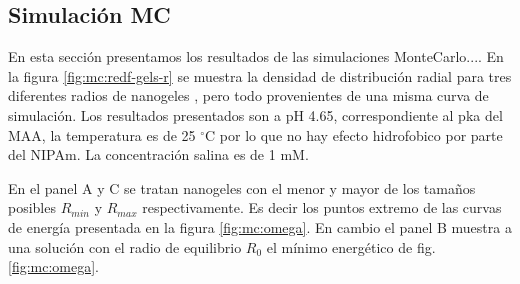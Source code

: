 






\subsection{Simulaci\'on MC}

En esta secci\'on presentamos los resultados de las simulaciones MonteCarlo....
En la figura \ref{fig:mc:redf-gels-r} se muestra la densidad de  distribuci\'on radial para tres diferentes radios de nanogeles , pero todo provenientes de una misma curva de simulaci\'on. Los resultados presentados son a pH 4.65, correspondiente al pka del MAA, la temperatura es de 25 $^\circ$C por lo que no hay efecto hidrofobico por parte del NIPAm. La concentraci\'on salina es de 1 mM.

En el panel A y C se tratan nanogeles con el menor y mayor de los tama\~nos posibles $R_{min}$ y $R_{max}$ respectivamente.  Es decir los puntos extremo de las curvas de energ\'ia presentada en la figura \ref{fig:mc:omega}. En cambio el panel B muestra a una soluci\'on con el radio de equilibrio $R_0$ el m\'inimo energ\'etico de fig. \ref{fig:mc:omega}.

